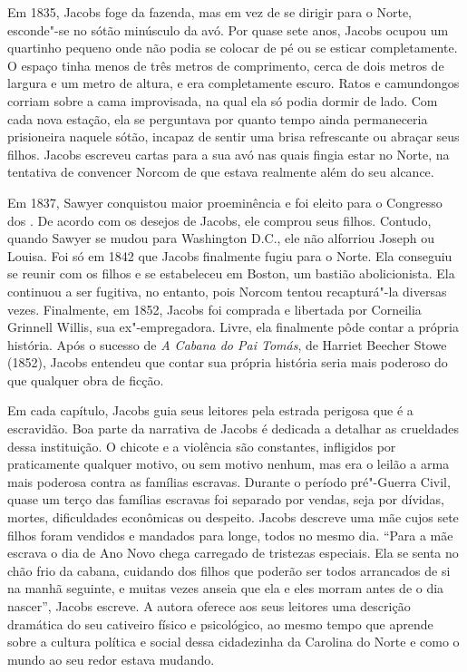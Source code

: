 Em 1835, Jacobs foge da fazenda, mas em vez de se dirigir para o Norte,
esconde"-se no sótão minúsculo da avó. Por quase sete anos, Jacobs ocupou
um quartinho pequeno onde não podia se colocar de pé ou se esticar
completamente. O espaço tinha menos de três metros de comprimento, cerca
de dois metros de largura e um metro de altura, e era completamente
escuro. Ratos e camundongos corriam sobre a cama improvisada, na qual
ela só podia dormir de lado. Com cada nova estação, ela se perguntava
por quanto tempo ainda permaneceria prisioneira naquele sótão, incapaz
de sentir uma brisa refrescante ou abraçar seus filhos. Jacobs escreveu
cartas para a sua avó nas quais fingia estar no Norte, na tentativa de
convencer Norcom de que estava realmente além do seu alcance.

Em 1837, Sawyer conquistou maior proeminência e foi eleito para o
Congresso dos . De acordo com os desejos de Jacobs, ele comprou seus
filhos. Contudo, quando Sawyer se mudou para Washington D.C., ele não
alforriou Joseph ou Louisa. Foi só em 1842 que Jacobs finalmente fugiu
para o Norte. Ela conseguiu se reunir com os filhos e se estabeleceu em
Boston, um bastião abolicionista. Ela continuou a ser fugitiva, no
entanto, pois Norcom tentou recapturá"-la diversas vezes. Finalmente, em
1852, Jacobs foi comprada e libertada por Corneilia Grinnell Willis, sua
ex"-empregadora. Livre, ela finalmente pôde contar a própria história.
Após o sucesso de \emph{A Cabana do Pai Tomás}, de Harriet Beecher Stowe
(1852), Jacobs entendeu que contar sua própria história seria mais
poderoso do que qualquer obra de ficção.

Em cada capítulo, Jacobs guia seus leitores pela estrada perigosa que é
a escravidão. Boa parte da narrativa de Jacobs é dedicada a detalhar as
crueldades dessa instituição. O chicote e a violência são constantes,
infligidos por praticamente qualquer motivo, ou sem motivo nenhum, mas
era o leilão a arma mais poderosa contra as famílias escravas.
Durante o período pré"-Guerra Civil, quase um terço das famílias escravas
foi separado por vendas, seja por dívidas,
mortes, dificuldades econômicas ou despeito. Jacobs descreve uma mãe
cujos sete filhos foram vendidos e mandados para longe, todos no mesmo
dia. ``Para a mãe escrava o dia de Ano Novo chega carregado de tristezas
especiais. Ela se senta no chão frio da cabana, cuidando dos filhos que
poderão ser todos arrancados de si na manhã seguinte, e muitas vezes
anseia que ela e eles morram antes de o dia nascer'', Jacobs escreve. A
autora oferece aos seus leitores uma descrição dramática do seu
cativeiro físico e psicológico, ao mesmo tempo que aprende sobre a
cultura política e social dessa cidadezinha da Carolina do Norte e como
o mundo ao seu redor estava mudando.

